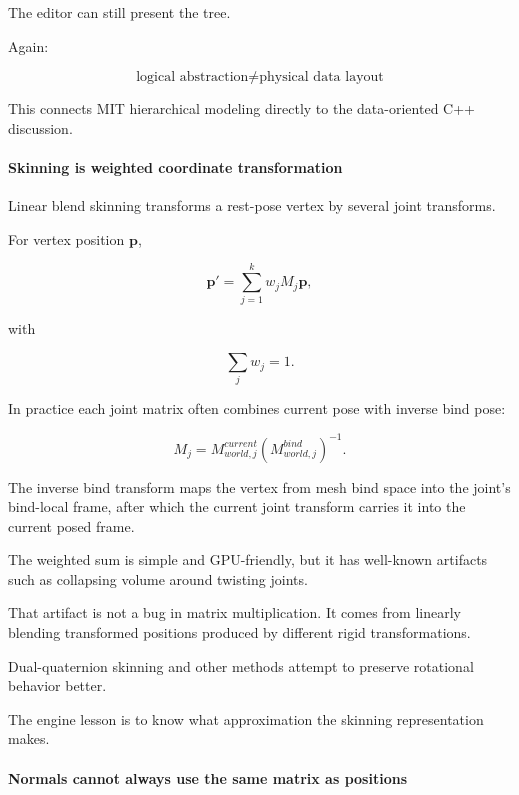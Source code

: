 The editor can still present the tree.

Again:

\[
\boxed{
\text{logical abstraction}
\neq
\text{physical data layout}
}
\]

This connects MIT hierarchical modeling directly to the data-oriented C++ discussion.

\paragraph{Skinning is weighted coordinate transformation}\label{03-visual-computing-i-ch001-skinning-is-weighted-coordinate-transformation}

\hypertarget{03-visual-computing-i-ch001-skinning-is-weighted-coordinate-transformation}{}

Linear blend skinning transforms a rest-pose vertex by several joint transforms.

For vertex position \(\mathbf p\),

\[
\mathbf p'
=
\sum_{j=1}^{k}
w_j
M_j
\mathbf p,
\]

with

\[
\sum_j w_j=1.
\]

In practice each joint matrix often combines current pose with inverse bind pose:

\[
M_j
=
M_{world,j}^{current}
\left(M_{world,j}^{bind}\right)^{-1}.
\]

The inverse bind transform maps the vertex from mesh bind space into the joint's bind-local frame, after which the current joint transform carries it into the current posed frame.

The weighted sum is simple and GPU-friendly, but it has well-known artifacts such as collapsing volume around twisting joints.

That artifact is not a bug in matrix multiplication. It comes from linearly blending transformed positions produced by different rigid transformations.

Dual-quaternion skinning and other methods attempt to preserve rotational behavior better.

The engine lesson is to know what approximation the skinning representation makes.

\paragraph{Normals cannot always use the same matrix as positions}\label{03-visual-computing-i-ch001-normals-cannot-always-use-the-same-matrix-as-positions}

